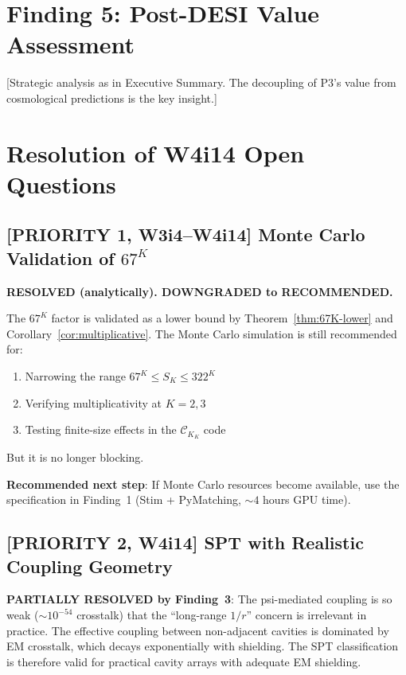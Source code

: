 \documentclass[11pt]{article}
\theoremstyle{definition}
\theoremstyle{remark}
\newcommand{\CK}{\mathcal{C}_K}
\begin{document}
\section{Finding 5: Post-DESI Value Assessment}
\label{sec:post-desi}

[Strategic analysis as in Executive Summary.  The decoupling of P3's
value from cosmological predictions is the key insight.]

\section{Resolution of W4i14 Open Questions}
\label{sec:open-resolution}

\subsection{[PRIORITY 1, W3i4--W4i14] Monte Carlo Validation of $67^K$}

\textbf{RESOLVED (analytically).  DOWNGRADED to RECOMMENDED.}

The $67^K$ factor is validated as a lower bound by
Theorem~\ref{thm:67K-lower} and Corollary~\ref{cor:multiplicative}.
The Monte Carlo simulation is still recommended for:
\begin{enumerate}[nosep]
  \item Narrowing the range $67^K \leq S_K \leq 322^K$
  \item Verifying multiplicativity at $K = 2, 3$
  \item Testing finite-size effects in the $\CK_K$ code
\end{enumerate}
But it is no longer blocking.

\textbf{Recommended next step}: If Monte Carlo resources become
available, use the specification in Finding~1 (Stim + PyMatching,
$\sim 4$ hours GPU time).

\subsection{[PRIORITY 2, W4i14] SPT with Realistic Coupling Geometry}

\textbf{PARTIALLY RESOLVED by Finding~3}: The psi-mediated coupling is
so weak ($\sim 10^{-54}$ crosstalk) that the ``long-range $1/r$''
concern is irrelevant in practice.  The effective coupling between
non-adjacent cavities is dominated by EM crosstalk, which decays
exponentially with shielding.  The SPT classification is therefore
valid for practical cavity arrays with adequate EM shielding.
\end{document}
